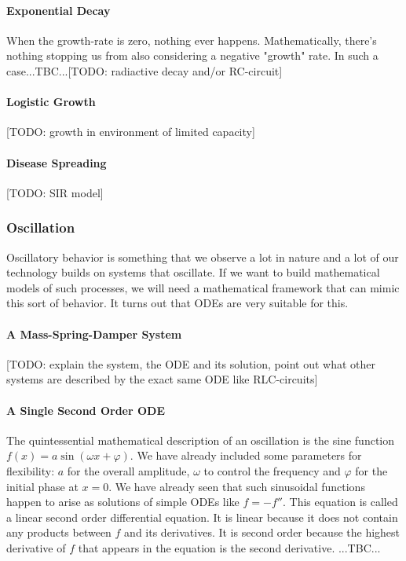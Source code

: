 \paragraph{Exponential Decay}
When the growth-rate is zero, nothing ever happens. Mathematically, there's nothing stopping us from also considering a negative "growth" rate. In such a case...TBC...[TODO: radiactive decay and/or RC-circuit]


\paragraph{Logistic Growth} [TODO: growth in environment of limited capacity]


\paragraph{Disease Spreading} [TODO: SIR model]




\subsubsection{Oscillation}
Oscillatory behavior is something that we observe a lot in nature and a lot of our technology builds on systems that oscillate. If we want to build mathematical models of such processes, we will need a mathematical framework that can mimic this sort of behavior. It turns out that ODEs are very suitable for this.

\paragraph{A Mass-Spring-Damper System}
[TODO: explain the system, the ODE and its solution, point out what other systems are described by the exact same ODE like RLC-circuits]

\paragraph{A Single Second Order ODE}
The quintessential mathematical description of an oscillation is the sine function $f(x) = a \sin(\omega x + \varphi)$. We have already included some parameters for flexibility: $a$ for the overall amplitude, $\omega$ to control the frequency and $\varphi$ for the initial phase at $x=0$. We have already seen that such sinusoidal functions happen to arise as solutions of simple ODEs like $f = -f''$. This equation is called a linear second order differential equation. It is linear because it does not contain any products between $f$ and its derivatives. It is second order because the highest derivative of $f$ that appears in the equation is the second derivative. ...TBC...

